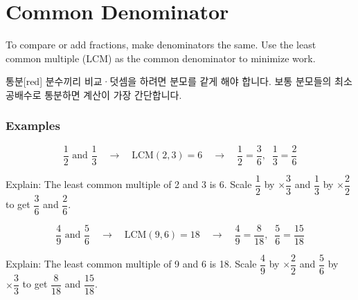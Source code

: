 \documentclass[12pt]{book}
\begin{document}

\twosidedpaper
\section{Common Denominator}

To compare or add fractions, make denominators the same.  
Use the least common multiple (LCM) as the common denominator to minimize work.


\begin{flexbox}{통분}[red]
분수끼리 비교·덧셈을 하려면 분모를 같게 해야 합니다.  
보통 분모들의 최소공배수로 통분하면 계산이 가장 간단합니다.
\end{flexbox}

\subsubsection*{Examples}

\[
\dfrac{1}{2} \text{ and } \dfrac{1}{3}
\quad \rightarrow \quad
\text{LCM}(2,3)=6
\quad \rightarrow \quad
\dfrac{1}{2}=\dfrac{3}{6},\;\; \dfrac{1}{3}=\dfrac{2}{6}
\]

Explain: The least common multiple of 2 and 3 is 6.  
Scale \(\dfrac{1}{2}\) by \( \times \dfrac{3}{3}\) and \(\dfrac{1}{3}\) by \( \times \dfrac{2}{2}\) to get \(\dfrac{3}{6}\) and \(\dfrac{2}{6}\).



\[
\dfrac{4}{9} \text{ and } \dfrac{5}{6}
\quad \rightarrow \quad
\text{LCM}(9,6)=18
\quad \rightarrow \quad
\dfrac{4}{9}=\dfrac{8}{18},\;\; \dfrac{5}{6}=\dfrac{15}{18}
\]

Explain: The least common multiple of 9 and 6 is 18.  
Scale \(\dfrac{4}{9}\) by \( \times \dfrac{2}{2}\) and \(\dfrac{5}{6}\) by \( \times \dfrac{3}{3}\) to get \(\dfrac{8}{18}\) and \(\dfrac{15}{18}\).
\end{document}
